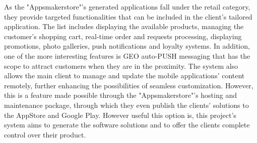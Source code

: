 As the "Appsmakerstore"'s generated applications fall under the retail category, they provide targeted functionalities that can be included in the client's tailored application. The list includes displaying the available products, managing the customer's shopping cart, real-time order and requests processing, displaying promotions, photo galleries, push notifications and loyalty systems. In addition, one of the more interesting features is GEO auto-PUSH messaging that has the scope to attract customers when they are in the proximity.
The system also allows the main client to manage and update the mobile applications' content remotely, further enhancing the possibilities of seamless customization. However, this is a feature made possible through the "Appsmakerstore"'s hosting and maintenance package, through which they even publish the clients' solutions to the AppStore and Google Play. However useful this option is, this project's system aims to generate the software solutions and to offer the clients complete control over their product.